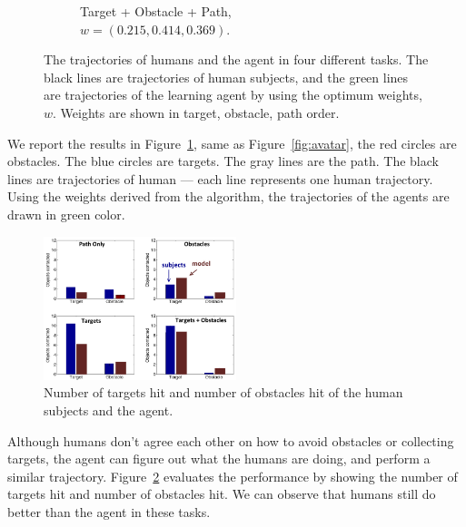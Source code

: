 \documentclass[11pt]{article} %
\begin{document}
\begin{figure}[h!]
\begin{subfigure}[b]{0.24\textwidth}
\caption{Target + Obstacle + Path, \\$w = (0.215, 0.414, 0.369)$. }
\end{subfigure}
\caption{The trajectories of humans and the agent in four different tasks. The
black lines are trajectories of human subjects, and the green lines are
trajectories of the learning agent by using the optimum weights, $w$. Weights
are shown in target, obstacle, path order.}

\label{fig:exp}
\end{figure}

We report the results in Figure~\ref{fig:exp}, same as Figure~\ref{fig:avatar},
the red circles are obstacles. The blue circles are targets. The gray lines are
the path. The black lines are trajectories of human --- each line represents one
human trajectory.
Using the weights derived from the algorithm, the trajectories of the agents are
drawn in green color.

\begin{figure}[h!]
\centering
\includegraphics[width=0.5\textwidth]{contactStats.png}
\caption{Number of targets hit and number of obstacles hit of the human subjects
and the agent.}
\label{fig:stats}
\end{figure}

Although humans don't agree each other on how to avoid obstacles or collecting
targets, the agent can figure out what the humans are doing, and perform a
similar trajectory. Figure~\ref{fig:stats} evaluates the
performance by showing the number of targets hit and number of obstacles hit.
We can observe that humans still do better than the agent in these tasks.
\end{document}
